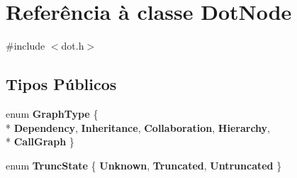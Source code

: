 \hypertarget{class_dot_node}{\section{Referência à classe Dot\-Node}
\label{class_dot_node}
}


{\ttfamily \#include $<$dot.\-h$>$}

\subsection*{Tipos Públicos}
\begin{DoxyCompactItemize}
\item 
enum {\bfseries Graph\-Type} \{ \\*
{\bfseries Dependency}, 
{\bfseries Inheritance}, 
{\bfseries Collaboration}, 
{\bfseries Hierarchy}, 
\\*
{\bfseries Call\-Graph}
 \}
\item 
enum {\bfseries Trunc\-State} \{ {\bfseries Unknown}, 
{\bfseries Truncated}, 
{\bfseries Untruncated}
 \}
\end{DoxyCompactItemize}
